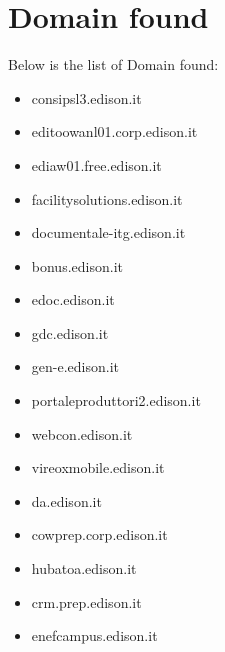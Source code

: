 \documentclass{article}
\begin{document}
\clearpage

\section{Domain found}

Below is the list of Domain found:

\begin{itemize}
    
        
            \item consipsl3.edison.it
        
            \item editoowanl01.corp.edison.it
        
            \item ediaw01.free.edison.it
        
            \item facilitysolutions.edison.it
        
            \item documentale-itg.edison.it
        
            \item bonus.edison.it
        
            \item edoc.edison.it
        
            \item gdc.edison.it
        
            \item gen-e.edison.it
        
            \item portaleproduttori2.edison.it
        
            \item webcon.edison.it
        
            \item vireoxmobile.edison.it
        
            \item da.edison.it
        
            \item cowprep.corp.edison.it
        
            \item hubatoa.edison.it
        
            \item crm.prep.edison.it
        
            \item enefcampus.edison.it
        

\end{itemize}
\end{document}
